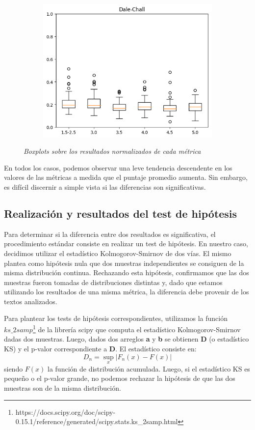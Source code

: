 \documentclass[12pt,journal,compsoc]{IEEEtran}
\begin{document}
\begin{figure}[H]
\begin{subfigure}{0.27\textwidth}
\includegraphics[scale=0.41]{../unigrams/scripts/boxplots/Dale-Chall.png}
\end{subfigure}
\caption{\small \textit{Boxplots sobre los resultados normalizados de cada métrica}}
\label{fig:boxplots}
\end{figure}

En todos los casos, podemos observar una leve tendencia descendente en los valores de las métricas a medida que el puntaje promedio aumenta. Sin embargo, es difícil discernir a simple vista si las diferencias son significativas.

\subsection{Realización y resultados del test de hipótesis}

Para determinar si la diferencia entre dos resultados es significativa, el procedimiento estándar consiste en realizar un test de hipótesis. En nuestro caso, decidimos utilizar el estadístico Kolmogorov-Smirnov de dos vías. El mismo plantea como hipótesis nula que dos muestras independientes se consiguen de la misma distribución continua. Rechazando esta hipótesis, confirmamos que las dos muestras fueron tomadas de distribuciones distintas y, dado que estamos utilizando los resultados de una misma métrica, la diferencia debe provenir de los textos analizados.

Para plantear los tests de hipótesis correspondientes, utilizamos la función $ks\_2samp$\footnote{https://docs.scipy.org/doc/scipy-0.15.1/reference/generated/scipy.stats.ks\_2samp.html} de la librería scipy que computa el estadístico Kolmogorov-Smirnov dadas dos muestras. Luego, dados dos arreglos \textbf{a} y \textbf{b} se obtienen \textbf{D} (o estadístico KS) y el p-valor correspondiente a \textbf{D}. El estadístico consiste en:
$$D_{n}=\sup_{x}|F_{n}(x)-F(x)|$$
siendo $F(x)$ la función de distribución acumulada. Luego, si el estadístico KS es pequeño o el p-valor grande, no podemos rechazar la hipótesis de que las dos muestras son de la misma distribución\cite{degroot}.\\
\end{document}
